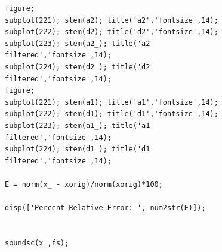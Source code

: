 \documentclass{article}
\begin{document}
\begin{figure}[H]
\begin{lstlisting}
figure;
subplot(221); stem(a2); title('a2','fontsize',14);
subplot(222); stem(d2); title('d2','fontsize',14);
subplot(223); stem(a2_); title('a2 filtered','fontsize',14);
subplot(224); stem(d2_); title('d2 filtered','fontsize',14);
figure;
subplot(221); stem(a1); title('a1','fontsize',14);
subplot(222); stem(d1); title('d1','fontsize',14);
subplot(223); stem(a1_); title('a1 filtered','fontsize',14);
subplot(224); stem(d1_); title('d1 filtered','fontsize',14);

E = norm(x_ - xorig)/norm(xorig)*100;

disp(['Percent Relative Error: ', num2str(E)]);


soundsc(x_,fs);
\end{lstlisting}
\end{figure}
\end{document}
